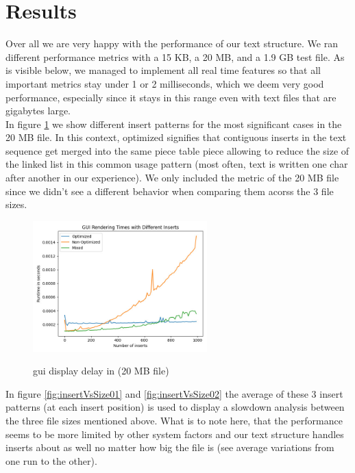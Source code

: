 \section{Results}\label{sec:results}

Over all we are very happy with the performance of our text structure. We ran different performance metrics with a 15 KB, a 20 MB, and a 1.9 GB test file. As is visible below, we managed to implement all real time features so that all important metrics stay under 1 or 2 milliseconds, which we deem very good performance, especially since it stays in this range even with text files that are gigabytes large.
\\In figure \ref{fig:renderMetric} we show different insert patterns for the most significant cases in the 20 MB file. In this context, optimized signifies that contiguous inserts in the text sequence get merged into the same piece table piece allowing to reduce the size of the linked list in this common usage pattern (most often, text is written one char after another in our experience). We only included the metric of the 20 MB file since we didn't see a different behavior when comparing them acorss the 3 file sizes.
\begin{figure}[H]
    \centering
    \caption{gui display delay in (20 MB file)}
    \includegraphics[width=0.6\textwidth]{./images/Profiler-Render-Metric-Size1.jpg}
    \label{fig:renderMetric}
\end{figure}
In figure \ref{fig:insertVsSize01} and \ref{fig:insertVsSize02} the average of these 3 insert patterns (at each insert position) is used to display a slowdown analysis between the three file sizes mentioned above. What is to note here, that the performance seems to be more limited by other system factors and our text structure handles inserts about as well no matter how big the file is (see average variations from one run to the other).
